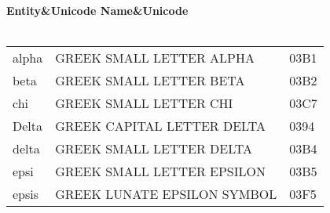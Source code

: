 \documentclass{article}
\begin{document}
\begin{table}
\tablehead
 {\bfseries Entity&\bfseries Unicode Name&\bfseries Unicode\\ \hline}
\tabletail
 {\hline {}\\}
\tablelasttail{\hline}
\begin{supertabular}{lll}
alpha  & GREEK SMALL LETTER ALPHA      & 03B1\\
beta   & GREEK SMALL LETTER BETA       & 03B2\\
chi    & GREEK SMALL LETTER CHI        & 03C7\\
Delta  & GREEK CAPITAL LETTER DELTA    & 0394\\
delta  & GREEK SMALL LETTER DELTA      & 03B4\\
epsi   & GREEK SMALL LETTER EPSILON    & 03B5\\
epsis  & GREEK LUNATE EPSILON SYMBOL   & 03F5\\
\end{supertabular}
\end{table}
\end{document}
